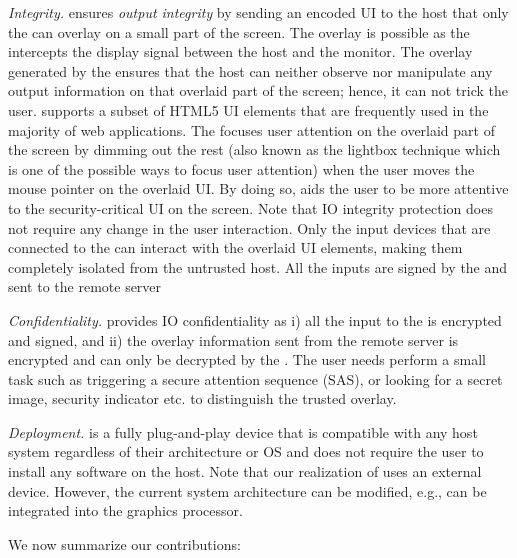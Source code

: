 \emph{Integrity.} \name ensures \emph{output integrity} by sending an encoded UI to the host that only the \device can overlay on a small part of the screen. The overlay is possible as the \device intercepts the display signal between the host and the monitor. The overlay generated by the \device ensures that the host can neither observe nor manipulate any output information on that overlaid part of the screen; hence, it can not trick the user. \device supports a subset of HTML5 UI elements that are frequently used in the majority of web applications. The \device focuses user attention on the overlaid part of the screen by dimming out the rest (also known as the lightbox technique which is one of the possible ways to focus user attention) when the user moves the mouse pointer on the overlaid UI. By doing so, \name aids the user to be more attentive to the security-critical UI on the screen. Note that \name IO integrity protection does not require any change in the user interaction. Only the input devices that are connected to the \device can interact with the overlaid UI elements, making them completely isolated from the untrusted host. All the inputs are signed by the \device and sent to the remote server

\emph{Confidentiality.} \name provides IO confidentiality as i) all the input to the \device is encrypted and signed, and ii) the overlay information sent from the remote server is encrypted and can only be decrypted by the \device. The user needs perform a small task such as triggering a secure attention sequence (SAS), or looking for a secret image, security indicator etc. to distinguish the trusted overlay.


\emph{Deployment.} \device is a fully plug-and-play device that is compatible with any host system regardless of their architecture or OS and does not require the user to install any software on the host. Note that our realization of \name uses an external device. However, the current system architecture can be modified, e.g., \device can be integrated into the graphics processor. 

 We now summarize our contributions:



